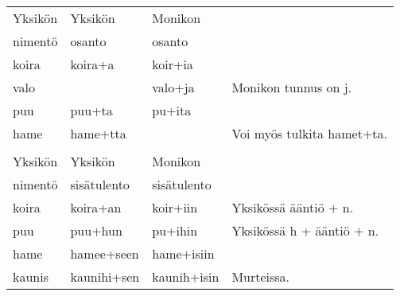 \begin{table}
\begin{tabular}{@{}|l|l|l|l|}
         &          &          & \\ \hline
Yksikön  & Yksikön  & Monikon  & \\
nimentö  & osanto   & osanto   & \\ \hline
koira    & koira+a  & koir+ia  & \\
valo     &          & valo+ja  & Monikon tunnus on j. \\
puu      & puu+ta   & pu+ita   & \\
hame     & hame+tta &          & Voi myös tulkita hamet+ta. \\ \hline


         &             &             & \\ \hline
Yksikön  & Yksikön     & Monikon     & \\
nimentö  & sisätulento & sisätulento & \\ \hline
koira    & koira+an    & koir+iin    & Yksikössä ääntiö + n. \\
puu      & puu+hun     & pu+ihin     & Yksikössä h + ääntiö + n. \\
hame     & hamee+seen  & hame+isiin  & \\
kaunis   & kaunihi+sen & kaunih+isin & Murteissa. \\ \hline
\end{tabular}
\end{table}
